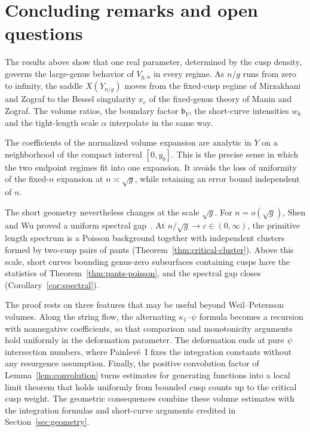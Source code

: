 \section{Concluding remarks and open questions}

The results above show that one real parameter, determined by the cusp
density, governs the large-genus behavior of $V_{g,n}$ in every regime.
As $n/g$ runs from zero to infinity, the saddle $X(Y_{n/g})$ moves from
the fixed-cusp regime of Mirzakhani and Zograf to the Bessel singularity
$x_c$ of the fixed-genus theory of Manin and Zograf. The volume ratios,
the boundary factor $\mathfrak b_Y$, the short-curve intensities $w_k$
and the tight-length scale $\alpha$ interpolate in the same way.

The coefficients of the normalized volume expansion are analytic in
$Y$ on a neighborhood of the compact interval $[0,y_0]$. This is the
precise sense in which the two endpoint regimes fit into one expansion.
It avoids the loss of uniformity of the fixed-$n$ expansion at
$n\asymp\sqrt g$, while retaining an error bound independent of $n$.

The short geometry nevertheless changes at the scale $\sqrt g$.
For $n=o(\sqrt g)$, Shen and Wu proved a uniform spectral
gap~\cite[Theorem~3]{SW}. At $n/\sqrt g\to c\in(0,\infty)$, the
primitive length spectrum is a Poisson background together with
independent clusters formed by two-cusp pairs of pants
(Theorem~\ref{thm:critical-cluster}). Above this scale, short curves
bounding genus-zero subsurfaces containing cusps have the statistics of
Theorem~\ref{thm:pants-poisson}, and the spectral gap closes
(Corollary~\ref{cor:spectral}).

The proof rests on three features that may be useful beyond
Weil--Petersson volumes. Along the string flow, the alternating
$\kappa_1$--$\psi$ formula becomes a recursion with nonnegative
coefficients, so that comparison and monotonicity arguments hold
uniformly in the deformation parameter. The deformation ends at pure
$\psi$ intersection numbers, where Painlev\'e~I fixes the integration
constants without any resurgence assumption. Finally, the positive
convolution factor of Lemma~\ref{lem:convolution} turns estimates for
generating functions into a local limit theorem that holds uniformly
from bounded cusp counts up to the critical cusp weight. The geometric
consequences combine these volume estimates with the integration
formulas and short-curve arguments credited in
Section~\ref{sec:geometry}.



